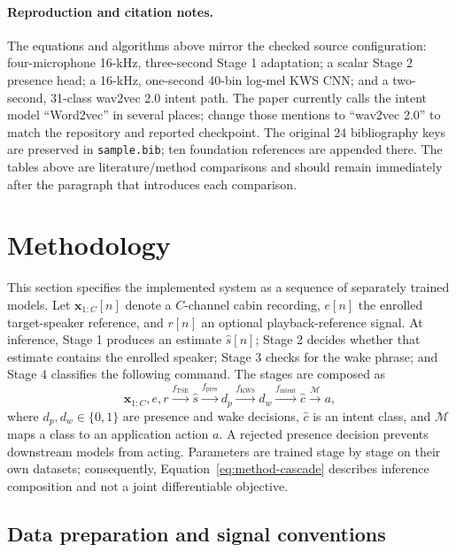 \paragraph{Reproduction and citation notes.}
The equations and algorithms above mirror the checked source configuration: four-microphone 16-kHz, three-second Stage 1 adaptation; a scalar Stage 2 presence head; a 16-kHz, one-second 40-bin log-mel KWS CNN; and a two-second, 31-class wav2vec 2.0 intent path. The paper currently calls the intent model ``Word2vec'' in several places; change those mentions to ``wav2vec 2.0'' to match the repository and reported checkpoint. The original 24 bibliography keys are preserved in \texttt{sample.bib}; ten foundation references are appended there. The tables above are literature/method comparisons and should remain immediately after the paragraph that introduces each comparison.

\section{Methodology}
\label{sec:methodology}

This section specifies the implemented system as a sequence of separately trained models. Let $\mathbf{x}_{1:C}[n]$ denote a $C$-channel cabin recording, $e[n]$ the enrolled target-speaker reference, and $r[n]$ an optional playback-reference signal. At inference, Stage 1 produces an estimate $\hat{s}[n]$; Stage 2 decides whether that estimate contains the enrolled speaker; Stage 3 checks for the wake phrase; and Stage 4 classifies the following command. The stages are composed as
\begin{equation}
  \mathbf{x}_{1:C},e,r \xrightarrow{f_{\mathrm{TSE}}} \hat{s}
  \xrightarrow{f_{\mathrm{pres}}} d_p
  \xrightarrow{f_{\mathrm{KWS}}} d_w
  \xrightarrow{f_{\mathrm{intent}}} \hat{c}
  \xrightarrow{\mathcal{M}} a,
  \label{eq:method-cascade}
\end{equation}
where $d_p,d_w\in\{0,1\}$ are presence and wake decisions, $\hat{c}$ is an intent class, and $\mathcal{M}$ maps a class to an application action $a$. A rejected presence decision prevents downstream models from acting. Parameters are trained stage by stage on their own datasets; consequently, Equation~\eqref{eq:method-cascade} describes inference composition and not a joint differentiable objective.

\subsection{Data preparation and signal conventions}
\label{subsec:method-data}

